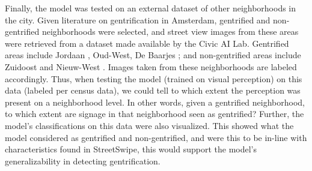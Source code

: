 Finally, the model was tested on an external dataset of other neighborhoods in the city. Given literature on gentrification in Amsterdam, gentrified and non-gentrified neighborhoods were selected, and street view images from these areas were retrieved from a dataset made available by the Civic AI Lab. Gentrified areas include Jordaan \cite{verlaan_hippies_2022}, Oud-West, De Baarjes \cite{rettberg_when_2019}; and non-gentrified areas include Zuidoost and Nieuw-West \cite{pinkster_stickiness_2020}. Images taken from these neighborhoods are labeled accordingly. Thus, when testing the model (trained on visual perception) on this data (labeled per census data), we could tell to which extent the perception was present on a neighborhood level. In other words, given a gentrified neighborhood, to which extent are signage in that neighborhood seen as gentrified? Further, the model's classifications on this data were also visualized. This showed what the model considered as gentrified and non-gentrified, and were this to be in-line with characteristics found in StreetSwipe, this would support the model's generalizability in detecting gentrification.

